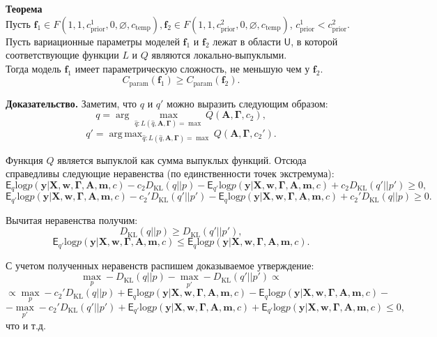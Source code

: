 \documentclass[12pt]{article}
\DeclareMathOperator*{\argmax}{arg\,max}
\begin{document}
\textbf{Теорема}\\
Пусть $\mathbf{f}_1 \in F(1, 1, c_{\text{prior}}^1, 0, \varnothing,  c_{\text{temp}} ), \mathbf{f}_2 \in F(1, 1, c_{\text{prior}}^2, 0, \varnothing,  c_{\text{temp}})$, $c_{\text{prior}}^1 < c_{\text{prior}}^2$.\\
Пусть вариационные параметры моделей $\mathbf{f}_1$ и $\mathbf{f}_2$ лежат в области $\mathsf{U}$, в которой соответствующие функции $L$ и $Q$ являются локально-выпуклыми.\\ 
Тогда модель $\mathbf{f}_1$ имеет параметрическую сложность, не меньшую чем у $\mathbf{f}_2$.
\[
    C_\text{param}(\mathbf{f}_1) \geq C_\text{param}(\mathbf{f}_2).
\]

\textbf{Доказательство.}
Заметим, что $q$ и $q'$ можно выразить следующим образом:
\[
    q = \arg\max_{\hat{q}: L(\hat{q}, \mathbf{A}, \boldsymbol{\Gamma}) = \max} Q( \mathbf{A}, \boldsymbol{\Gamma}, c_2),
\]
\[
    q' = \argmax_{\hat{q}: L(\hat{q}, \mathbf{A}, \boldsymbol{\Gamma})  = \max} Q( \mathbf{A}, \boldsymbol{\Gamma}, c_2').
\]

Функция $Q$ является выпуклой как сумма выпуклых функций. Отсюда справедливы следующие неравенства (по единственности точек экстремума):
\[
    \mathsf{E}_{q}\text{log} p(\mathbf{y}|\mathbf{X},\mathbf{w}, \boldsymbol{\Gamma}, \mathbf{A},\mathbf{m}, c) - c_2  D_\text{KL}(q||p)  -  \mathsf{E}_{q'}\text{log} p(\mathbf{y}|\mathbf{X},\mathbf{w}, \boldsymbol{\Gamma}, \mathbf{A},\mathbf{m}, c) + c_2  D_\text{KL}(q'||p') \geq 0,
\]
\[
    \mathsf{E}_{q'}\text{log} p(\mathbf{y}|\mathbf{X},\mathbf{w}, \boldsymbol{\Gamma}, \mathbf{A},\mathbf{m}, c) - c_2'  D_\text{KL}(q'||p')  -  \mathsf{E}_{q}\text{log} p(\mathbf{y}|\mathbf{X},\mathbf{w}, \boldsymbol{\Gamma}, \mathbf{A},\mathbf{m}, c) + c_2'  D_\text{KL}(q||p) \geq 0.
\]

Вычитая неравенства получим:
\[
    D_\text{KL}(q||p) \geq D_\text{KL}(q'||p'),
\]
\[
    \mathsf{E}_{q'}\text{log} p(\mathbf{y}|\mathbf{X},\mathbf{w}, \boldsymbol{\Gamma}, \mathbf{A},\mathbf{m}, c)  \leq \mathsf{E}_{q}\text{log} p(\mathbf{y}|\mathbf{X},\mathbf{w}, \boldsymbol{\Gamma}, \mathbf{A},\mathbf{m}, c) .
\]

С учетом полученных неравенств распишем доказываемое утверждение:
\[
    \max_p -D_\text{KL}(q||p) - \max_{p'} -D_\text{KL}(q'||p') \propto 
\]
\[ \propto\max_p - c_2' D_\text{KL}(q||p) +\mathsf{E}_{q}\text{log} p(\mathbf{y}|\mathbf{X},\mathbf{w}, \boldsymbol{\Gamma}, \mathbf{A},\mathbf{m}, c) - \mathsf{E}_{q}\text{log} p(\mathbf{y}|\mathbf{X},\mathbf{w}, \boldsymbol{\Gamma}, \mathbf{A},\mathbf{m}, c) -
\]
\[  - \max_{p'} -c_2' D_\text{KL}(q'||p')  + \mathsf{E}_{q'}\text{log} p(\mathbf{y}|\mathbf{X},\mathbf{w}, \boldsymbol{\Gamma}, \mathbf{A},\mathbf{m}, c) +\mathsf{E}_{q'}\text{log} p(\mathbf{y}|\mathbf{X},\mathbf{w}, \boldsymbol{\Gamma}, \mathbf{A},\mathbf{m}, c)     \leq 0,  
\]
что и т.д.
\end{document}
